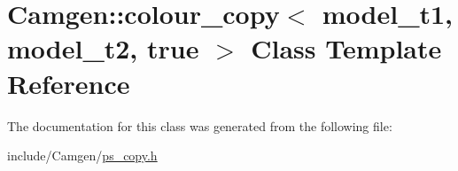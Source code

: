\hypertarget{a00073}{\section{Camgen\-:\-:colour\-\_\-copy$<$ model\-\_\-t1, model\-\_\-t2, true $>$ Class Template Reference}
\label{a00073}
}


The documentation for this class was generated from the following file\-:\begin{DoxyCompactItemize}
\item 
include/\-Camgen/\hyperlink{a00712}{ps\-\_\-copy.\-h}\end{DoxyCompactItemize}
